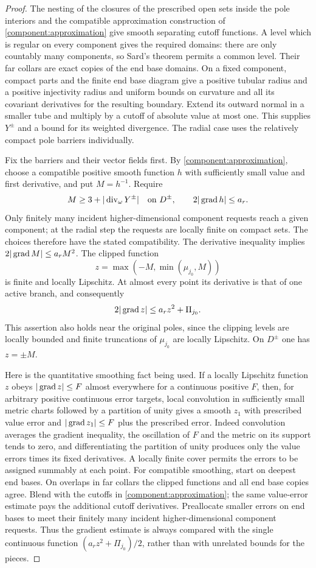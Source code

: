 \begin{proof}
The nesting of the closures of the prescribed open sets inside the pole interiors and the
compatible approximation construction of \cref{component:approximation}
give smooth separating cutoff functions.  A level which is regular on
every component gives the required domains: there are only countably many
components, so Sard's theorem permits a common level.  Their far collars
are exact copies of the end base domains.  On a fixed component, compact parts
and the finite end base diagram give a positive tubular radius and a positive injectivity radius and uniform bounds on curvature and all its covariant derivatives for the resulting boundary.  Extend its outward normal in a
smaller tube and multiply by a cutoff of absolute value at most one.
This supplies $Y^\pm$ and a bound for its weighted divergence.  The radial
case uses the relatively compact pole barriers individually.

Fix the barriers and their vector fields first.  By
\cref{component:approximation}, choose a compatible positive smooth function
$h$ with sufficiently small value and first derivative, and put $M=h^{-1}$.
Require
\[
 M\ge3+|\operatorname{div}_\omega Y^\pm|\quad\hbox{on }D^\pm,
 \qquad 2|\operatorname{grad} h|\le a_r.
\]
Only finitely many incident higher-dimensional component requests reach a given component; at the radial
step the requests are locally finite on compact sets.  The choices
therefore have the stated compatibility.  The derivative inequality implies
$2|\operatorname{grad} M|\le a_rM^2$.  The clipped function
\[
                  z=\max(-M,\min(\mu_{j_0},M))
\]
is finite and locally Lipschitz.  At almost every point its derivative is
that of one active branch, and consequently
\[
                    2|\operatorname{grad} z|\le a_r z^2+\Pi_{j_0}.
\]
This assertion also holds near the original poles, since the clipping
levels are locally bounded and finite truncations of $\mu_{j_0}$ are
locally Lipschitz.  On $D^\pm$ one has $z=\pm M$.

Here is the quantitative smoothing fact being used.  If a locally
Lipschitz function $z$ obeys $|\operatorname{grad} z|\le F$ almost everywhere for a
continuous positive $F$, then, for arbitrary positive continuous error
targets, local convolution in sufficiently small metric charts followed
by a partition of unity gives a smooth $z_1$ with prescribed value error
and $|\operatorname{grad} z_1|\le F$ plus the prescribed error.  Indeed convolution
averages the gradient inequality, the oscillation of $F$ and the metric
on its support tends to zero, and differentiating the partition of unity
produces only the value errors times its fixed derivatives.  A locally
finite cover permits the errors to be assigned summably at each point.
For compatible smoothing, start on deepest end bases.  On overlaps in far
collars the clipped functions and all end base copies agree.  Blend with the
cutoffs in \cref{component:approximation}; the same value-error estimate
pays the additional cutoff derivatives.  Preallocate smaller errors on
end bases to meet their finitely many incident higher-dimensional component requests.  Thus the gradient
estimate is always compared with the single continuous function
$(a_rz^2+\Pi_{j_0})/2$, rather than with unrelated bounds for the pieces.


\end{proof}
